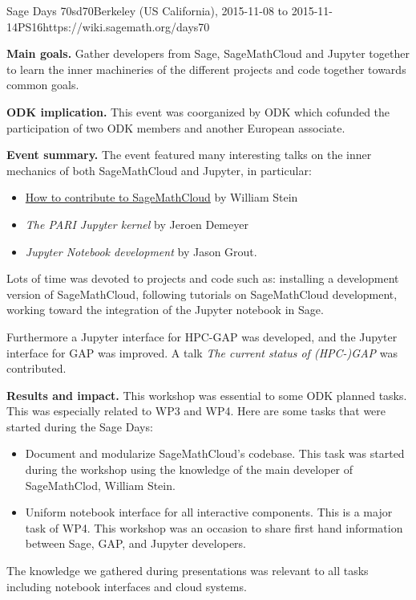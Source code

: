 \begin{event}{Sage Days 70}{sd70}{Berkeley (US California), 2015-11-08 to 2015-11-14}{PS}{16}{https://wiki.sagemath.org/days70}

\textbf{Main goals.} Gather developers from Sage, SageMathCloud and Jupyter together to learn the
inner machineries of the different projects and code together towards common goals.

\textbf{ODK implication.} This event was coorganized by ODK which
cofunded the participation of two ODK members and another European
associate.

\textbf{Event summary.} The event featured many interesting talks on the inner mechanics of
both SageMathCloud and Jupyter, in particular:
\begin{itemize}
\item \href{https://youtu.be/GOuy07Kift4}{How to contribute to SageMathCloud} by William Stein
\item \emph{The PARI Jupyter kernel} by Jeroen Demeyer
\item \emph{Jupyter Notebook development} by Jason Grout.
\end{itemize}
Lots of time was devoted to projects and code such as: installing a development version of SageMathCloud,
following tutorials on SageMathCloud development, working toward the integration of the Jupyter notebook
in Sage.

Furthermore a Jupyter interface for HPC-GAP was developed, and the Jupyter
interface for GAP was improved. A talk \emph{The current status of (HPC-)GAP}
was contributed.

\textbf{Results and impact.} 
This workshop was essential to some ODK planned tasks. This was especially related to WP3 and WP4. Here are some tasks that
were started during the Sage Days:
\begin{itemize}
\item {} Document and modularize SageMathCloud's codebase. This task was started during the workshop using the 
knowledge of the main developer of SageMathClod, William Stein.

\item {} Uniform notebook interface for all interactive components. This is a major task of WP4. This workshop
was an occasion to share first hand information between Sage, GAP, and Jupyter developers.

\end{itemize}
The knowledge we gathered during presentations was relevant to all tasks including notebook interfaces and cloud
systems.

\end{event}
